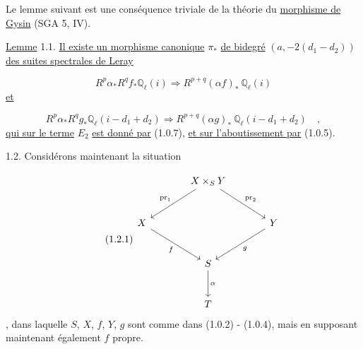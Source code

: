 Le lemme suivant est une conséquence triviale de la théorie du \underline{morphisme de Gysin} (SGA 5, IV).

\underline{Lemme} 1.1. \underline{Il existe un morphisme canonique} $\pi_*$ \underline{de bidegré} $(a,-2(d_1-d_2))$ \underline{des suites spectrales de Leray}

\begin{equation}\tag{1.1.0}
R^p \alpha_* R^q f_* \mathbb{Q}_\ell(i) \Longrightarrow R^{p+q}(\alpha f)_* \ \mathbb{Q}_\ell(i)
\end{equation}
\underline{et}

\begin{equation}\tag{1.1.1}
R^p \alpha_* R^q g_* \mathbb{Q}_\ell(i-d_1+d_2) \Longrightarrow R^{p+q}(\alpha g)_* \ \mathbb{Q}_\ell(i-d_1+d_2) \quad ,
\end{equation}
\underline{qui sur le terme} $E_2$ \underline{est donné par} (1.0.7), \underline{et sur l'aboutissement par} (1.0.5).

1.2. Considérons maintenant la situation

\begin{equation}\tag{1.2.1}
\begin{tikzcd}[column sep=large, row sep=large]
{} & X \times_S Y \arrow[dl, "\mathrm{pr}_1"'] \arrow[dr, "\mathrm{pr}_2"] & {} \\
X \arrow[dr, "f"'] & {} & Y \arrow[dl, "g"] \\
{} & S \arrow[d, "\alpha"] & {} \\
{} & T &
{} \end{tikzcd}
\end{equation}
,
dans laquelle $S$, $X$, $f$, $Y$, $g$ sont comme dans (1.0.2) - (1.0.4), mais en supposant maintenant également $f$ propre.

